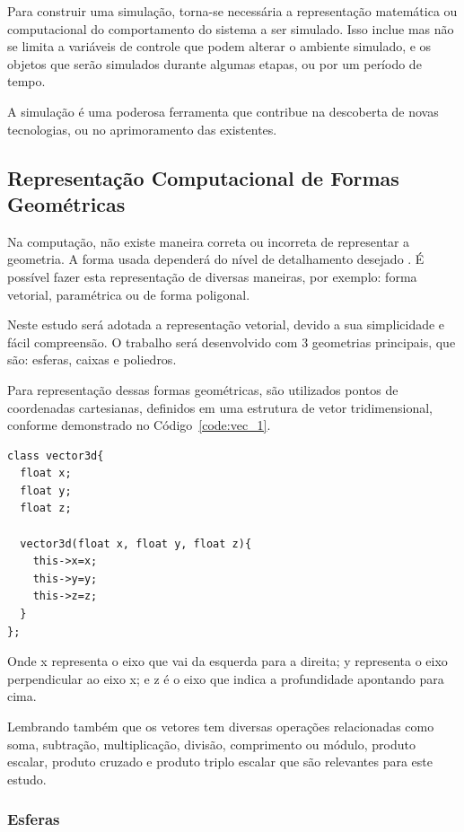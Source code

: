 Para construir uma simulação, torna-se necessária a representação matemática ou
computacional do comportamento do sistema a ser simulado. Isso inclue mas não
se limita a variáveis de controle que podem alterar o ambiente simulado, e os
objetos que serão simulados durante algumas etapas, ou por um período de tempo.

A simulação é uma poderosa ferramenta que contribue na descoberta de novas
tecnologias, ou no aprimoramento das existentes.


\subsection{Representação Computacional de Formas Geométricas}
Na computação, não existe maneira correta ou incorreta de representar a geometria. A forma usada dependerá do nível de detalhamento desejado . É possível fazer esta representação de diversas maneiras, por exemplo: forma vetorial, paramétrica ou de forma poligonal.

Neste estudo será adotada a representação vetorial, devido a sua simplicidade e fácil compreensão. O trabalho será desenvolvido com 3 geometrias principais, que são: esferas, caixas e poliedros.

Para representação dessas formas geométricas, são utilizados pontos de coordenadas cartesianas, definidos em uma estrutura de vetor tridimensional, conforme demonstrado no Código~\ref{code:vec_1}.

\begin{lstlisting}[frame=single,caption=Exemplo de vetor 3d\label{code:vec_1}]
class vector3d{
  float x;
  float y;
  float z;

  vector3d(float x, float y, float z){
    this->x=x;
    this->y=y;
    this->z=z;
  }
};
\end{lstlisting}

Onde x representa o eixo que vai da esquerda para a direita;
y representa o eixo  perpendicular ao eixo x;
e z é o eixo que indica a profundidade apontando para cima.


Lembrando também que os vetores tem diversas operações relacionadas como soma,
subtração, multiplicação, divisão, comprimento ou módulo, produto escalar,
produto cruzado e produto triplo escalar que são relevantes para este estudo.

\subsubsection{Esferas}

